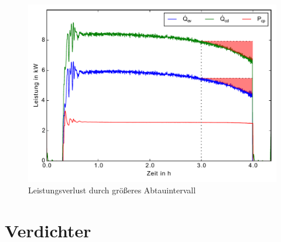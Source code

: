 \begin{figure}[h!]
\centering
\includegraphics[scale=0.8]{Pictures/50powerloss.pdf}
\caption{Leistungsverlust durch größeres Abtauintervall}
\label{fig:Leistungsverlust4h3h}
\end{figure}




\clearpage


















\section{Verdichter}
\label{sec:Verdichter}

